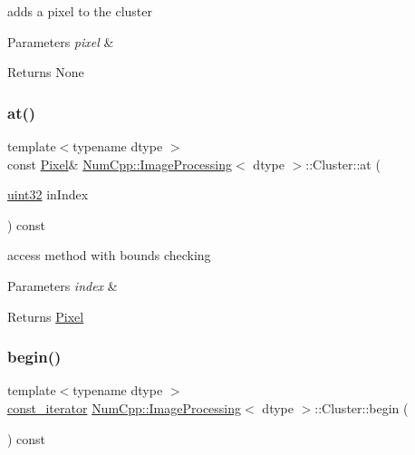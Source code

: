 adds a pixel to the cluster


\begin{DoxyParams}{Parameters}
{\em pixel} & \\
\hline
\end{DoxyParams}
\begin{DoxyReturn}{Returns}
None 
\end{DoxyReturn}
\mbox{\label{class_num_cpp_1_1_image_processing_1_1_cluster_acb1723012708c5d01715bcbaa9ae9659}} 
\subsubsection{\texorpdfstring{at()}{at()}}
{\footnotesize\ttfamily template$<$typename dtype $>$ \\
const \mbox{\hyperlink{class_num_cpp_1_1_image_processing_1_1_pixel}{Pixel}}\& \mbox{\hyperlink{class_num_cpp_1_1_image_processing}{Num\+Cpp\+::\+Image\+Processing}}$<$ dtype $>$\+::Cluster\+::at (\begin{DoxyParamCaption}\item[{\mbox{\hyperlink{namespace_num_cpp_a36f388e948380413c63011cab9b7fbd5}{uint32}}}]{in\+Index }\end{DoxyParamCaption}) const\hspace{0.3cm}{\ttfamily [inline]}}

access method with bounds checking


\begin{DoxyParams}{Parameters}
{\em index} & \\
\hline
\end{DoxyParams}
\begin{DoxyReturn}{Returns}
\mbox{\hyperlink{class_num_cpp_1_1_image_processing_1_1_pixel}{Pixel}} 
\end{DoxyReturn}
\mbox{\label{class_num_cpp_1_1_image_processing_1_1_cluster_a202b31339744938c1acec76b64169eef}} 
\subsubsection{\texorpdfstring{begin()}{begin()}}
{\footnotesize\ttfamily template$<$typename dtype $>$ \\
\mbox{\hyperlink{class_num_cpp_1_1_image_processing_1_1_cluster_a8f26defce53112d60fd1a178b5669ce6}{const\+\_\+iterator}} \mbox{\hyperlink{class_num_cpp_1_1_image_processing}{Num\+Cpp\+::\+Image\+Processing}}$<$ dtype $>$\+::Cluster\+::begin (\begin{DoxyParamCaption}{ }\end{DoxyParamCaption}) const\hspace{0.3cm}{\ttfamily [inline]}}

